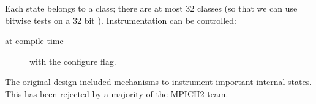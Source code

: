 \documentclass{article}
\begin{document}
Each state belongs to a class; there are at most 32 classes (so that we can use
bitwise tests on a 32 bit ).  Instrumentation can be
controlled:
\begin{description}
\item[at compile time]with the  configure
  flag.



\end{description}

The original design included mechanisms to instrument important
internal states.  This has been rejected by a majority of the MPICH2
team.



\end{document}

